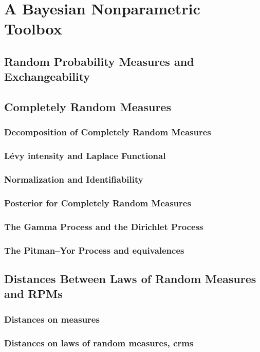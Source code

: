 \chapter{A Bayesian Nonparametric Toolbox}

\section{Random Probability Measures and Exchangeability}
\section{Completely Random Measures}


\subsection{Decomposition of Completely Random Measures}
\subsection{L\'evy intensity and Laplace Functional}
\subsection{Normalization and Identifiability}
\subsection{Posterior for Completely Random Measures}
\subsection{The Gamma Process and the Dirichlet Process}
\subsection{The Pitman--Yor Process and equivalences}


\section{Distances Between Laws of Random Measures and RPMs}
\subsection{Distances on measures}
\subsection{Distances on laws of random measures, crms}

